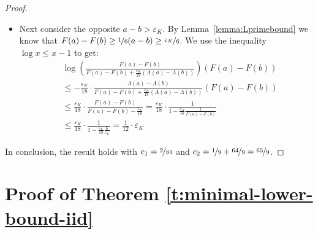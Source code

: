 \documentclass[final,12pt]{colt2025}
\newcommand{\e}{\varepsilon}
\newcommand{\lrb}[1]{\left(#1\right)}
\newcommand{\nb}{b}
\newcommand{\ns}{a}
\begin{document}
\begin{proof}
\begin{itemize}
    \item Next consider the opposite $\ns - \nb > \e_K$. By Lemma~\ref{lemma:Lprimebound} we know that $F(\ns) - F(\nb) \ge \nicefrac{1}{6} (\ns - \nb) \ge \nicefrac{\e_K}{6}$. We use the inequality $\log x \leq x-1$ to get:
    \begin{align*}
    &
        \log\lrb{\frac{F(\ns)-F(\nb)}{F(\ns)-F(\nb)+\frac{\e_K}{18}(\Lambda(\ns)-\Lambda(\nb))}} (F(\ns) -F(\nb)) \\
    &
        \leq -\frac{\e_K}{18} \cdot \frac{\Lambda(\ns)-\Lambda(\nb)}{F(\ns)-F(\nb)+\frac{\e_K}{18}(\Lambda(\ns)-\Lambda(\nb))} (F(\ns)-F(\nb))
    \\ &
        \leq \frac{\e_K}{18} \cdot \frac{F(\ns)-F(\nb)}{F(\ns)-F(\nb)-\frac{\e_K}{18}}
        = \frac{\e_K}{18} \cdot \frac{1}{1-\frac{\e_K}{18}\frac{1}{F(\ns)-F(\nb)}}
    \\ &
        \leq \frac{\e_K}{18} \cdot \frac{1}{1-\frac{\e_K}{18}\frac{6}{\e_K}}
        = \frac{1}{12} \cdot \e_K
    \end{align*}
\end{itemize}
In conclusion, the result holds with $c_1 = \nicefrac{2}{81}$ and $c_2 = \nicefrac{1}{9} + \nicefrac{64}{9} = \nicefrac{65}{9}$.
\end{proof}














\section{Proof of Theorem \ref{t:minimal-lower-bound-iid}}
\label{s:liner-lower-bound-appe}
\end{document}
